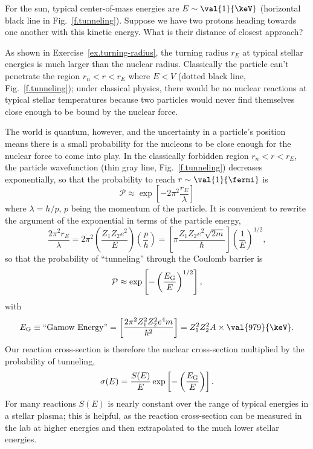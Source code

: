 \begin{exercisebox}
\label{ex.turning-radius}
For the sun, typical center-of-mass energies are $E \sim \val{1}{\keV}$ (horizontal black line in Fig.~\ref{f.tunneling}). Suppose we have two protons heading towards one another with this kinetic  energy. What is their distance of closest approach?
\end{exercisebox}

As shown in Exercise~\ref{ex.turning-radius}, the turning radius $r_{E}$ at typical stellar energies is much larger than the nuclear radius.  Classically the particle can't penetrate the region $r_{n} < r < r_{E}$ where $E < V$ (dotted black line, Fig.~\ref{f.tunneling}); under classical physics, there would be no nuclear reactions at typical stellar temperatures because two particles would never find themselves close enough to be bound by the nuclear force.

The world is quantum, however, and the uncertainty in a particle's position means there is a small probability for the nucleons to be close enough for the nuclear force to come into play. In the classically forbidden region $r_{n} < r < r_{E}$, the particle wavefunction (thin gray line, Fig.~\ref{f.tunneling}) decreases exponentially, so that the probability to reach $r\sim\val{1}{\fermi}$ is
\[ \mathcal{P}\approx \exp\left[-2\pi^{2}\frac{r_{E}}{\lambda}\right] \]
where $\lambda = h/p$, $p$ being the momentum of the particle.
It is convenient to rewrite the argument of the exponential in terms of the particle energy,
\[ \frac{2\pi^{2}r_{E}}{\lambda} = 2\pi^{2}\left(\frac{Z_{1}Z_{2}e^{2}}{E}\right)
	\left(\frac{p}{h}\right) = \left[\pi \frac{Z_{1}Z_{2}e^{2}\sqrt{2m}}{\hbar}\right]\left(\frac{1}{E}\right)^{1/2}, \]
so that the probability of ``tunneling'' through the Coulomb barrier is
\begin{equation}
\mathcal{P} \approx \exp\left[-\left(\frac{E_{\mathrm{G}}}{E}\right)^{1/2}\right],
\end{equation}
with
\[ \EG \equiv \textrm{``Gamow Energy''} = \left[\frac{2\pi^{2}Z_{1}^{2}Z_{2}^{2}e^{4}m}{\hbar^{2}}\right] = Z_{1}^{2}Z_{2}^{2}A \times \val{979}{\keV}.
\]
Our reaction cross-section is therefore the nuclear cross-section multiplied by the probability of tunneling, 
\begin{equation}\label{e.s-def}
\sigma(E) = \frac{S(E)}{E}\exp\left[-\left(\frac{E_{\mathrm{G}}}{E}\right)\right].
\end{equation}
For many reactions $S(E)$ is nearly constant over the range of typical energies in a stellar plasma; this is helpful, as the reaction cross-section can be measured in the lab at higher energies and then extrapolated to the much lower stellar energies.

